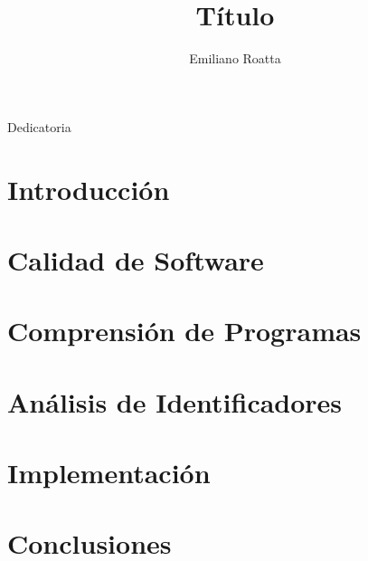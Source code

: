 \documentclass[a4paper,11pt,twoside,openright]{book}
\title{Título}
\author{Emiliano Roatta}
\begin{document}
\frontmatter

\maketitle

\begin{flushright}
\null{}
  Dedicatoria
\null
\end{flushright}



\tableofcontents
\listoffigures
\listoftables
\listofalgorithms

\mainmatter
\chapter{Introducción}


\chapter{Calidad de Software}


\chapter{Comprensión de Programas}






\chapter{Análisis de Identificadores}




\chapter{Implementación}






\chapter{Conclusiones}






\backmatter
\end{document}
